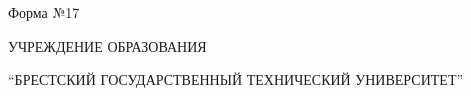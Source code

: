 \documentclass[12pt, А4, twoside]{article} %
\begin{document}
	
	\begin{flushright}{\fontsize{11}{13.75}\selectfont \cyrillicfont
			Форма №17
	} \end{flushright}
	
	\begin{center}  {\fontsize{14}{17.5}\selectfont \cyrillicfont 
			УЧРЕЖДЕНИЕ ОБРАЗОВАНИЯ
			\par %
			“БРЕСТСКИЙ ГОСУДАРСТВЕННЫЙ ТЕХНИЧЕСКИЙ УНИВЕРСИТЕТ”
	} \end{center}
	
\end{document}
